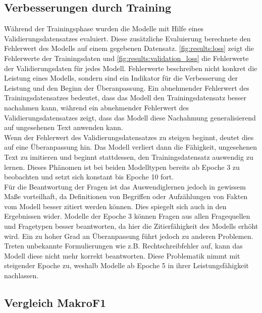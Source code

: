 \subsection{Verbesserungen durch Training}
Während der Trainingsphase wurden die Modelle mit Hilfe eines Validierungsdatensatzes evaluiert.
Diese zusätzliche Evaluierung berechnete den Fehlerwert des Modells auf einem gegebenen Datensatz.
\cref{fig:results:loss} zeigt die Fehlerwerte der Trainingsdaten und \cref{fig:results:validation_loss} die Fehlerwerte der Validierungsdaten für jedes Modell.
Fehlerwerte beschreiben nicht konkret die Leistung eines Modells, sondern sind ein Indikator für die Verbesserung der Leistung und den Beginn der Überanpassung.
Ein abnehmender Fehlerwert des Trainingsdatensatzes bedeutet, dass das Modell den Trainingsdatensatz besser nachahmen kann, während ein abnehmender Fehlerwert des Validierungsdatensatzes zeigt, dass das Modell diese Nachahmung generalisierend auf ungesehenen Text anwenden kann.\\

Wenn der Fehlerwert des Validierungsdatensatzes zu steigen beginnt, deutet dies auf eine Überanpassung hin.
Das Modell verliert dann die Fähigkeit, ungesehenen Text zu imitieren und beginnt stattdessen, den Trainingsdatensatz auswendig zu lernen.
Dieses Phänomen ist bei beiden Modelltypen bereits ab Epoche 3 zu beobachten und setzt sich konstant bis Epoche 10 fort.\\

Für die Beantwortung der Fragen ist das Auswendiglernen jedoch in gewissem Maße vorteilhaft, da Definitionen von Begriffen oder Aufzählungen von Fakten vom Modell besser zitiert werden können.
Dies spiegelt sich auch in den Ergebnissen wider.
Modelle der Epoche 3 können Fragen aus allen Fragequellen und Fragetypen besser beantworten, da hier die Zitierfähigkeit des Modells erhöht wird.
Ein zu hoher Grad an Überanpassung führt jedoch zu anderen Problemen.
Treten unbekannte Formulierungen wie z.B. Rechtschreibfehler auf, kann das Modell diese nicht mehr korrekt beantworten.
Diese Problematik nimmt mit steigender Epoche zu, weshalb Modelle ab Epoche 5 in ihrer Leistungsfähigkeit nachlassen.\\

\subsection{Vergleich MakroF1}

